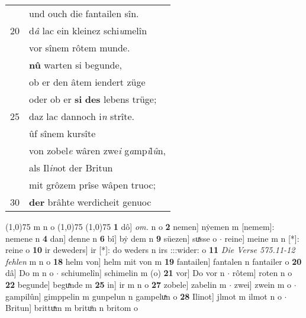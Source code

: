 \documentclass[8pt,a4paper,notitlepage]{article}
\begin{document}
\begin{table}[ht]
\begin{minipage}[t]{0.5\linewidth}
\begin{tabular}{rl}
 & und ouch die fantailen sîn.\\ 
20 & d\textit{â} lac ein kleinez schi\textit{u}melîn\\ 
 & vor sînem rôtem munde.\\ 
 & \textbf{nû} warten si begunde,\\ 
 & ob er den âtem iendert züge\\ 
 & oder ob er \textbf{si} \textbf{des} lebens trüge;\\ 
25 & daz lac dannoch i\textit{n} strîte.\\ 
 & ûf sînem kursîte\\ 
 & von zobel\textit{e} wâren zwe\textit{i} g\textit{a}mp\textit{i}l\textit{û}n,\\ 
 & als Il\textit{in}ot der Britun\\ 
 & mit grôzem prîse wâpen truoc;\\ 
30 & \textbf{der} brâhte werdicheit genuoc\\ 
\end{tabular}
\scriptsize
\line(1,0){75} \newline
m n o \newline
\line(1,0){75} \newline
\newline
\line(1,0){75} \newline
\textbf{1} dô] \textit{om.} n o \textbf{2} nemen] nẏemen m [nemem]: nemene n \textbf{4} dan] denne n \textbf{6} bî] bẏ dem n \textbf{9} süezen] suͯsse o  $\cdot$ reine] meine m n [*]: reine o \textbf{10} ir deweders] ir [*]: do weders n irs :::wider: o \textbf{11} \textit{Die Verse 575.11-12 fehlen} m n o  \textbf{18} helm von] helm mit von m \textbf{19} fantailen] fantalen n fantailer o \textbf{20} dâ] Do m n o  $\cdot$ schiumelîn] schimelin m (o) \textbf{21} vor] Do vor n  $\cdot$ rôtem] roten n o \textbf{22} begunde] beguͯnde m \textbf{25} in] ir m n o \textbf{27} zobele] zabelin m  $\cdot$ zwei] zwein m o  $\cdot$ gampilûn] gimppelin m gunpelun n gampeluͯn o \textbf{28} Ilinot] jlmot m ilmot n o  $\cdot$ Britun] brittuͯm m brituͦn n britom o \newline
\end{minipage}
\end{table}
\newpage
\end{document}
